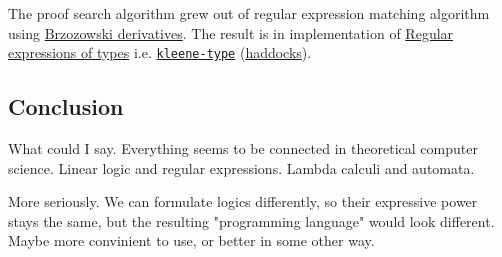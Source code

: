 \documentclass{article}
\begin{document}
The proof search algorithm grew out of regular expression matching
algorithm using \href{https://en.wikipedia.org/wiki/Brzozowski_derivative}{Brzozowski derivatives}.
The result is in implementation of \href{2018-09-13-regular-expressions-of-types.html}{Regular expressions of types}
i.e. \href{https://github.com/phadej/kleene-type}{\texttt{kleene-type}} (\href{http://oleg.fi/haddocks/kleene-type/}{haddocks}).

\subsection{Conclusion}

What could I say. Everything seems to be connected in theoretical computer science.
Linear logic and regular expressions. Lambda calculi and automata.

More seriously. We can formulate logics differently, so their expressive
power stays the same, but the resulting "programming language"
would look different. Maybe more convinient to use, or better in some
other way.
\end{document}
